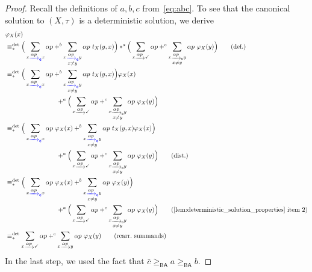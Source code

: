 \documentclass[orivec,envcountsect,envcountsame]{llncs}
\begin{document}
\begin{proof}%
	Recall the definitions of \(a,b,c\) from~\eqref{eq:abc}.
	To see that the canonical solution to \((X,\tau)\) is a deterministic solution, we derive
	\begin{align*}
		&\varphi_{X} (x) \\
		&\equiv_*^{\det} \Big(
		\sum_{x \etr{\alpha p} x} \alpha p
		+^{b} \sum_{\substack{x \etr{\alpha p} y \\ x \neq y}} \alpha p~t_X(y, x)
		\Big)*^{a} \Big(
		\sum_{x \tr{\alpha p} \checkmark} \alpha p
		+^{c} \sum_{\substack{x \tr{\alpha p}_{\mathsf b} y \\ x \neq y}} \alpha p~\varphi_X(y)
		\Big)
		\tag{def.}\\
		&\equiv_*^{\det} \Big(
		\sum_{x \etr{\alpha p} x} \alpha p
		+^{b} \sum_{\substack{x \etr{\alpha p} y \\ x \neq y}} \alpha p~t_X(y, x)
		\Big)\varphi_X(x) \\&\hspace{8em}+^{a} \Big(
		\sum_{x \tr{\alpha p} \checkmark} \alpha p
		+^{c} \sum_{\substack{x \tr{\alpha p}_{\mathsf b} y \\ x \neq y}} \alpha p~\varphi_X(y)
		\Big) \\
		&\equiv_*^{\det} \Big(
		\sum_{x \etr{\alpha p} x} \alpha p~\varphi_X(x)
		+^{b} \sum_{\substack{x \etr{\alpha p} y \\ x \neq y}} \alpha p~t_X(y, x) \varphi_X(x)
		\Big) \\&\hspace{8em}+^{a} \Big(
		\sum_{x \tr{\alpha p} \checkmark} \alpha p
		+^{c} \sum_{\substack{x \tr{\alpha p}_{\mathsf b} y \\ x \neq y}} \alpha p~\varphi_X(y)
		\Big)
		\tag{dist.}\\
		&\equiv_*^{\det} \Big(
		\sum_{x \etr{\alpha p} x} \alpha p~\varphi_X(x)
		+^{b} \sum_{\substack{x \etr{\alpha p} y \\ x \neq y}} \alpha p~\varphi_X(y)
		\Big) \\&\hspace{8em}+^{a} \Big(
		\sum_{x \tr{\alpha p} \checkmark} \alpha p
		+^{c} \sum_{\substack{x \tr{\alpha p}_{\mathsf b} y \\ x \neq y}} \alpha p~\varphi_X(y)
		\Big) \tag{\cref{lem:deterministic_solution_properties} item 2}\\
		&\equiv_*^{\det} 	 \sum_{x \tr{\alpha p} \checkmark} \alpha p +^{c} \sum_{x \tr{\alpha p} y} \alpha p~\varphi_X(y) \tag{rearr.~summands}
	\end{align*}
	In the last step, we used the fact that \(\bar c \ge_{\textsf{BA}} a \ge_{\textsf{BA}} b\).


\end{proof}
\end{document}
